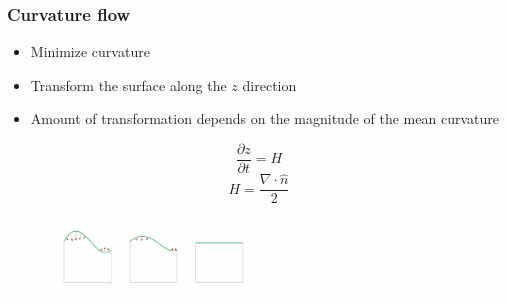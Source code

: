 \documentclass{beamer}
\begin{document}
	\begin{frame}[t]\frametitle{Curvature flow}
		\begin{itemize}
			\item Minimize curvature
			\item Transform the surface along the $z$ direction 
			\item Amount of transformation depends on the magnitude of the mean curvature
		\end{itemize}
		\begin{equation}
			\frac{\partial z}{\partial t} = H
		\end{equation}
		\begin{equation}
			H = \frac{\nabla \cdot \hat{n}}{2}
		\end{equation}
		\vspace{-2em}
		\begin{figure}
			\centering
			\includegraphics[width=0.5\textwidth]{curvatureflow.jpg}
		\end{figure}
	\end{frame}
	
\end{document}
